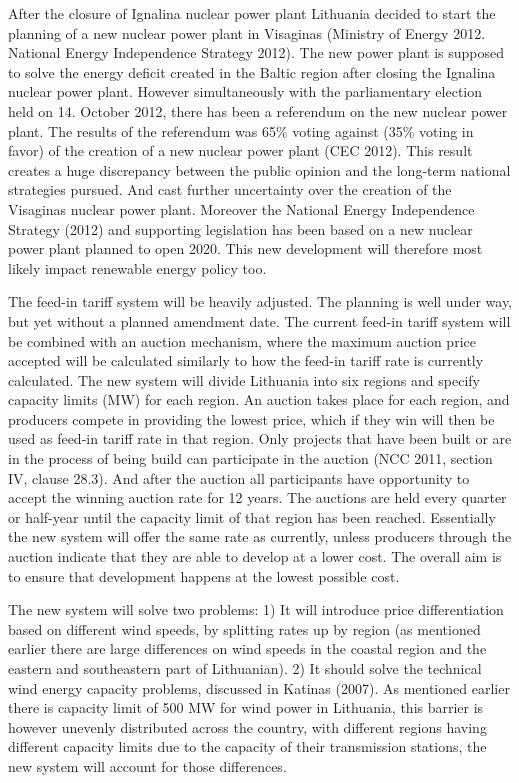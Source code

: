\documentclass[a4paper, 12pt]{article}
\begin{document}
After the closure of Ignalina nuclear power plant Lithuania decided to start the planning of a new nuclear power plant in Visaginas (Ministry of Energy 2012. National Energy Independence Strategy 2012). The new power plant is supposed to solve the energy deficit created in the Baltic region after closing the Ignalina nuclear power plant. However simultaneously with the parliamentary election held on 14. October 2012, there has been a referendum on the new nuclear power plant. The results of the referendum was 65\% voting against (35\% voting in favor) of the creation of a new nuclear power plant (CEC 2012). This result creates a huge discrepancy between the public opinion and the long-term national strategies pursued. And cast further uncertainty over the creation of the Visaginas nuclear power plant. Moreover the National Energy Independence Strategy (2012) and supporting legislation has been based on a new nuclear power plant planned to open 2020. This new development will therefore most likely impact renewable energy policy too.

The feed-in tariff system will be heavily adjusted. The planning is well under way, but yet without a planned amendment date. The current feed-in tariff system will be combined with an auction mechanism, where the maximum auction price accepted will be calculated similarly to how the feed-in tariff rate is currently calculated. The new system will divide Lithuania into six regions and specify capacity limits (MW) for each region. An auction takes place for each region, and producers compete in providing the lowest price, which if they win will then be used as feed-in tariff rate in that region. Only projects that have been built or are in the process of being build can participate in the auction (NCC 2011, section IV, clause 28.3). And after the auction all participants have opportunity to accept the winning auction rate for 12 years. The auctions are held every quarter or half-year until the capacity limit of that region has been reached. Essentially the new system will offer the same rate as currently, unless producers through the auction indicate that they are able to develop at a lower cost. The overall aim is to ensure that development happens at the lowest possible cost.

The new system will solve two problems: 1) It will introduce price differentiation based on different wind speeds, by splitting rates up by region (as mentioned earlier there are large differences on wind speeds in the coastal region and the eastern and southeastern part of Lithuanian). 2) It should solve the technical wind energy capacity problems, discussed in Katinas (2007). As mentioned earlier there is capacity limit of 500 MW for wind power in Lithuania, this barrier is however unevenly distributed across the country, with different regions having different capacity limits due to the capacity of their transmission stations, the new system will account for those differences.
\end{document}
